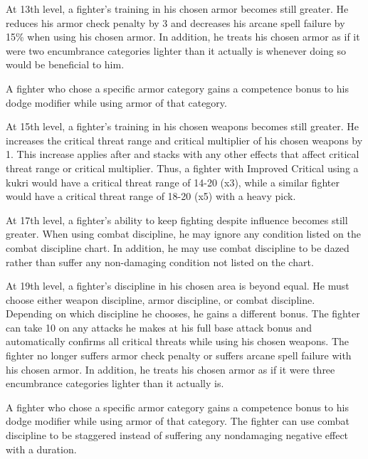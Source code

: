  At 13th level, a fighter's training in his chosen armor becomes still greater. He reduces his armor check penalty by 3 and decreases his arcane spell failure by 15\% when using his chosen armor. In addition, he treats his chosen armor as if it were two encumbrance categories lighter than it actually is whenever doing so would be beneficial to him.
\par A fighter who chose a specific armor category gains a  competence bonus to his dodge modifier while using armor of that category.

 At 15th level, a fighter's training in his chosen weapons becomes still greater. He increases the critical threat range and critical multiplier of his chosen weapons by 1. This increase applies after and stacks with any other effects that affect critical threat range or critical multiplier. Thus, a fighter with Improved Critical using a kukri would have a critical threat range of 14-20 (x3), while a similar fighter would have a critical threat range of 18-20 (x5) with a heavy pick.

 At 17th level, a fighter's ability to keep fighting despite influence becomes still greater. When using combat discipline, he may ignore any condition listed on the combat discipline chart. In addition, he may use combat discipline to be dazed rather than suffer any non-damaging condition not listed on the chart.

 At 19th level, a fighter's discipline in his chosen area is beyond equal. He must choose either weapon discipline, armor discipline, or combat discipline. Depending on which discipline he chooses, he gains a different bonus.
 The fighter can take 10 on any attacks he makes at his full base attack bonus and automatically confirms all critical threats while using his chosen weapons.
 The fighter no longer suffers armor check penalty or suffers arcane spell failure with his chosen armor. In addition, he treats his chosen armor as if it were three encumbrance categories lighter than it actually is.
\par A fighter who chose a specific armor category gains a  competence bonus to his dodge modifier while using armor of that category.
 The fighter can use combat discipline to be staggered instead of suffering any nondamaging negative effect with a duration.

